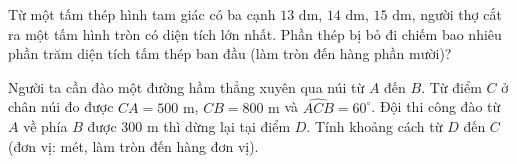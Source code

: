 \begin{bt}%
	Từ một tấm thép hình tam giác có ba cạnh $13\text{ dm}$, $14\text{ dm}$, $15\text{ dm}$, người thợ cắt ra một tấm hình tròn có diện tích lớn nhất. Phần thép bị bỏ đi chiếm bao nhiêu phần trăm diện tích tấm thép ban đầu (làm tròn đến hàng phần mười)?
\end{bt}

\begin{bt}%
	Người ta cần đào một đường hầm thẳng xuyên qua núi từ $A$ đến $B$. Từ điểm $C$ ở chân núi đo được $CA=500\text{ m}$, $CB=800\text{ m}$ và $\widehat{ACB}=60^\circ$. Đội thi công đào từ $A$ về phía $B$ được $300\text{ m}$ thì dừng lại tại điểm $D$. Tính khoảng cách từ $D$ đến $C$ (đơn vị: mét, làm tròn đến hàng đơn vị).
\end{bt}

